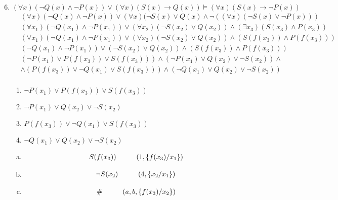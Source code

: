 \documentclass[a4paper,12pt, centered]{article}
\newcommand\tab[1][1cm]{\hspace*{#1}}
\begin{document}
\begin{enumerate}
	\setcounter{enumi}{5}
	\item $(\forall x)(\neg Q(x)\land\neg P(x))\lor(\forall x)(S(x)\to Q(x))\models(\forall x)(S(x)\to\neg P(x))$
		\begin{align*}
			&(\forall x)(\neg Q(x)\land\neg P(x))\lor(\forall x)(\neg S(x)\lor Q(x)\land\neg((\forall x)(\neg S(x)\lor\neg P(x)))\\
			&(\forall x_1)(\neg Q(x_1)\land\neg P(x_1))\lor(\forall x_2)(\neg S(x_2)\lor Q(x_2))\land(\exists x_3)( S(x_3)\land P(x_3))\\
			&(\forall x_1)(\neg Q(x_1)\land\neg P(x_1))\lor(\forall x_2)(\neg S(x_2)\lor Q(x_2))\land( S(f(x_3))\land P(f(x_3)))\\
			&(\neg Q(x_1)\land\neg P(x_1))\lor(\neg S(x_2)\lor Q(x_2))\land( S(f(x_3))\land P(f(x_3)))\\
			&(\neg P(x_1) \lor P(f(x_3)) \lor S(f(x_3))) \land  (\neg P(x_1) \lor Q(x_2) \lor \neg S(x_2)) \land \\& \land(P(f(x_3)) \lor \neg Q(x_1) \lor S(f(x_3))) \land  (\neg Q(x_1) \lor Q(x_2) \lor \neg S(x_2))\\
		\end{align*}
		\begin{multicols}{2}
			\begin{enumerate}[(1)] 
				\item $\neg P(x_1) \lor P(f(x_3)) \lor S(f(x_3))$
				\item $\neg P(x_1) \lor Q(x_2) \lor \neg S(x_2)$
				\item $P(f(x_3)) \lor \neg Q(x_1) \lor S(f(x_3))$
				\item $\neg Q(x_1) \lor Q(x_2) \lor \neg S(x_2)$
			\end{enumerate}
		\end{multicols}
		\begin{multicols}{2}
			\begin{enumerate}[(a)] 
				\item \begin{align*}
					S(f(x_3))\tab&(1,\{f(x_3)/x_1\})
				\end{align*}
				\item \begin{align*}
					\neg S(x_2)\tab&(4,\{x_2/x_1\})
				\end{align*}
				\item \begin{align*}
					\# \tab&(a, b,\{f(x_3)/x_2\})
				\end{align*}

\end{enumerate}
\end{multicols}
\end{enumerate}
\end{document}
